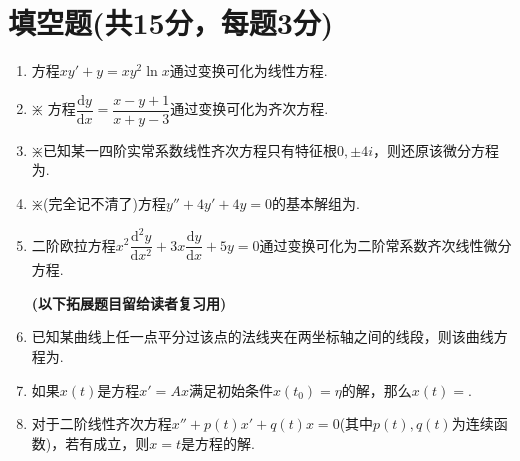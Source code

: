 \documentclass{ctexart}
\begin{document}
	\section{填空题(共15分，每题3分)}
	\begin{enumerate}
		\item 方程$xy'+y=xy^2\ln x$通过变换\underline{\makebox[6em]{ }}可化为线性方程.
		
		\item $\divideontimes$ 方程$\dfrac{\mathrm{d}y}{\mathrm{d}x}=\dfrac{x-y+1}{x+y-3}$通过变换\underline{\makebox[6em]{ }}可化为齐次方程.
		
		\item $\divideontimes$已知某一四阶实常系数线性齐次方程只有特征根$0,\pm4i$，则还原该微分方程为\underline{\makebox[6em]{ }}.
		
		\item $\divideontimes$(完全记不清了)方程$y''+4y'+4y=0$的基本解组为\underline{\makebox[6em]{ }}.
		
		\item 二阶欧拉方程$x^2\dfrac{\mathrm{d}^2 y}{\mathrm{d}x^2}+3x\dfrac{\mathrm{d}y}{\mathrm{d}x}+5y=0$通过变换\underline{\makebox[6em]{ }}可化为二阶常系数齐次线性微分方程.
		
		\vspace{1cm}
		\textbf{(以下拓展题目留给读者复习用)}
		\item 已知某曲线上任一点平分过该点的法线夹在两坐标轴之间的线段，则该曲线方程为\underline{\makebox[6em]{ }}.
		
		\item 如果$x(t)$是方程$x'=Ax$满足初始条件$x(t_0)=\eta$的解，那么$x(t)=$\underline{\makebox[6em]{ }}.
		
		\item 对于二阶线性齐次方程$x''+p(t)x'+q(t)x=0$(其中$p(t),q(t)$为连续函数)，若有\underline{\makebox[6em]{ }}成立，则$x=t$是方程的解.
	\end{enumerate}
	
\end{document}
